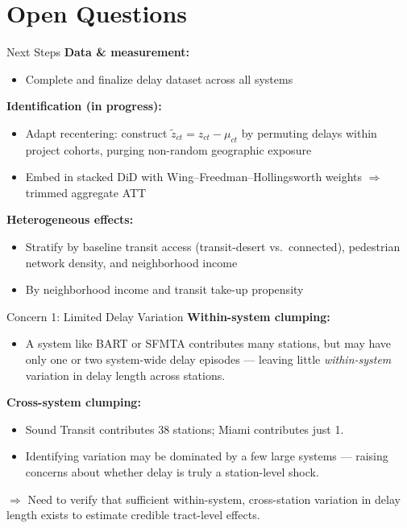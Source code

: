 \section{Open Questions}
\begin{frame}[label=nextsteps]{Next Steps}
\label{slide:nextsteps}
\small
\textbf{Data \& measurement:}
\begin{itemize}
  \item Complete and finalize delay dataset across all systems
\end{itemize}
\bigskip
\textbf{Identification (in progress):}
\begin{itemize}
  \item Adapt \textcite{borusyakNonrandomExposureExogenous2023} recentering: construct
        $\tilde{z}_{ct} = z_{ct} - \mu_{ct}$ by permuting delays within
        project cohorts, purging non-random geographic exposure
  \item Embed in stacked DiD \parencite{wingStackedDifferenceinDifferences2024} with
        Wing--Freedman--Hollingsworth weights $\Rightarrow$ trimmed aggregate ATT
\end{itemize}
\bigskip
\textbf{Heterogeneous effects:}
\begin{itemize}
  \item Stratify by baseline transit access (transit-desert vs.\ connected),
        pedestrian network density, and neighborhood income
  \item By neighborhood income and transit take-up propensity
\end{itemize}
\end{frame}
\begin{frame}[label=concern1]{Concern 1: Limited Delay Variation}
\small
\textbf{Within-system clumping:}
\begin{itemize}
  \item A system like BART or SFMTA contributes many stations, but may have only
        one or two system-wide delay episodes --- leaving little \textit{within-system}
        variation in delay length across stations.
\end{itemize}
\medskip
\textbf{Cross-system clumping:}
\begin{itemize}
  \item Sound Transit contributes 38 stations; Miami contributes just 1.
  \item Identifying variation may be dominated by a few large systems ---
        raising concerns about whether delay is truly a station-level shock.
\end{itemize}
\bigskip
$\Rightarrow$ Need to verify that sufficient within-system, cross-station
variation in delay length exists to estimate credible tract-level effects.
\end{frame}
